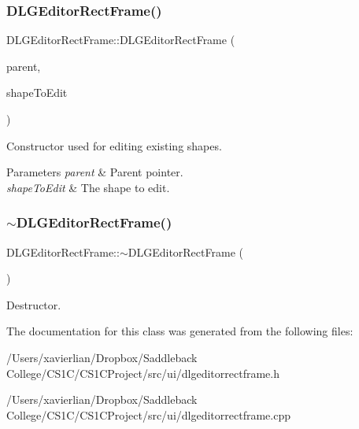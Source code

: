 \subsubsection{\texorpdfstring{DLGEditorRectFrame()}{DLGEditorRectFrame()}\hspace{0.1cm}{\footnotesize\ttfamily [2/2]}}
{\footnotesize\ttfamily D\+L\+G\+Editor\+Rect\+Frame\+::\+D\+L\+G\+Editor\+Rect\+Frame (\begin{DoxyParamCaption}\item[{Q\+Widget $\ast$}]{parent,  }\item[{\mbox{\hyperlink{class_i_shape}{I\+Shape}} $\ast$}]{shape\+To\+Edit }\end{DoxyParamCaption})\hspace{0.3cm}{\ttfamily [explicit]}}



Constructor used for editing existing shapes. 


\begin{DoxyParams}{Parameters}
{\em parent} & Parent pointer. \\
\hline
{\em shape\+To\+Edit} & The shape to edit. \\
\hline
\end{DoxyParams}
\mbox{\label{class_d_l_g_editor_rect_frame_a1d27bddcdac8f640544fd7768cfb0e02}} 
\subsubsection{\texorpdfstring{$\sim$DLGEditorRectFrame()}{~DLGEditorRectFrame()}}
{\footnotesize\ttfamily D\+L\+G\+Editor\+Rect\+Frame\+::$\sim$\+D\+L\+G\+Editor\+Rect\+Frame (\begin{DoxyParamCaption}{ }\end{DoxyParamCaption})\hspace{0.3cm}{\ttfamily [override]}}



Destructor. 



The documentation for this class was generated from the following files\+:\begin{DoxyCompactItemize}
\item 
/\+Users/xavierlian/\+Dropbox/\+Saddleback College/\+C\+S1\+C/\+C\+S1\+C\+Project/src/ui/dlgeditorrectframe.\+h\item 
/\+Users/xavierlian/\+Dropbox/\+Saddleback College/\+C\+S1\+C/\+C\+S1\+C\+Project/src/ui/dlgeditorrectframe.\+cpp\end{DoxyCompactItemize}
